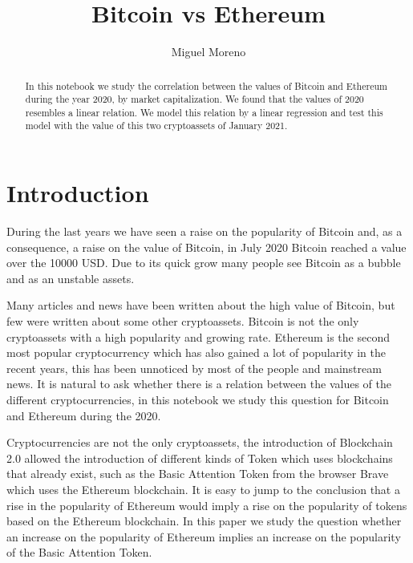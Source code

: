 \documentclass[11pt]{article}
\title{Bitcoin vs Ethereum}
\author{Miguel Moreno}
\begin{document}
    
    
    \maketitle
    
    

   \begin{abstract}
   In this notebook we study the correlation between the values
of Bitcoin and Ethereum during the year 2020, by market capitalization.
We found that the values of 2020 resembles a linear relation. We model
this relation by a linear regression and test this model with the value
of this two cryptoassets of January 2021.
   \end{abstract}


    \section{Introduction}\label{introduction}

During the last years we have seen a raise on the popularity of Bitcoin
and, as a consequence, a raise on the value of Bitcoin, in July 2020
Bitcoin reached a value over the 10000 USD. Due to its quick grow many
people see Bitcoin as a bubble and as an unstable assets.

Many articles and news have been written about the high value of
Bitcoin, but few were written about some other cryptoassets. Bitcoin is
not the only cryptoassets with a high popularity and growing rate.
Ethereum is the second most popular cryptocurrency which has also gained
a lot of popularity in the recent years, this has been unnoticed by most
of the people and mainstream news. It is natural to ask whether there is
a relation between the values of the different cryptocurrencies, in this
notebook we study this question for Bitcoin and Ethereum during the
2020.

Cryptocurrencies are not the only cryptoassets, the introduction of
Blockchain 2.0 allowed the introduction of different kinds of Token
which uses blockchains that already exist, such as the Basic Attention
Token from the browser Brave which uses the Ethereum blockchain. It is
easy to jump to the conclusion that a rise in the popularity of Ethereum
would imply a rise on the popularity of tokens based on the Ethereum
blockchain. In this paper we study the question whether an increase on
the popularity of Ethereum implies an increase on the popularity of the
Basic Attention Token.
\end{document}
